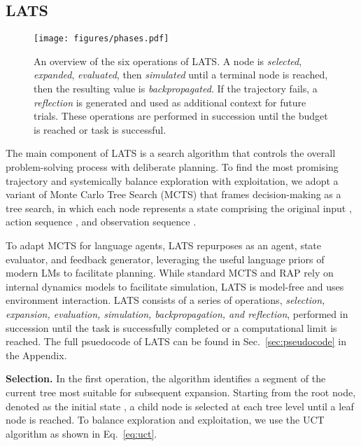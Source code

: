 \documentclass{article} \usepackage{iclr2024_conference,times}
\begin{document}
\subsection{LATS}
\label{sec:LATS}
\begin{figure}[t]
    \centering
    \texttt{[image: figures/phases.pdf]}
    \vspace{-0.3in}
    \caption{An overview of the six operations of LATS. A node is \textit{selected}, \textit{expanded}, \textit{evaluated}, then \textit{simulated} until a terminal node is reached, then the resulting value is \textit{backpropagated}. If the trajectory fails, a \textit{reflection} is generated and used as additional context for future trials. These operations are performed in succession until the budget is reached or task is successful.}
    \vspace{-0.2in}
    \label{fig:phases}
\end{figure}

The main component of LATS is a search algorithm that controls the overall problem-solving process with deliberate planning. To find the most promising trajectory and systemically balance exploration with exploitation, we adopt a variant of Monte Carlo Tree Search (MCTS) that frames decision-making as a tree search, in which each node  represents a state comprising the original input , action sequence , and observation sequence . 

To adapt MCTS for language agents, LATS repurposes  as an agent, state evaluator, and feedback generator, leveraging the useful language priors of modern LMs to facilitate planning. While standard MCTS and RAP \cite{hao2023reasoning} rely on internal dynamics models to facilitate simulation, LATS is model-free and uses environment interaction. LATS consists of a series of operations, \textit{selection, expansion, evaluation, simulation, backpropagation, and reflection}, performed in succession until the task is successfully completed or a computational limit is reached. The full psuedocode of LATS can be found in Sec.~\ref{sec:pseudocode} in the Appendix.

\textbf{Selection.}
In the first operation, the algorithm identifies a segment of the current tree most suitable for subsequent expansion. Starting from the root node, denoted as the initial state , a child node is selected at each tree level until a leaf node is reached. To balance exploration and exploitation, we use the UCT algorithm as shown in Eq.~\ref{eq:uct}.
\end{document}
